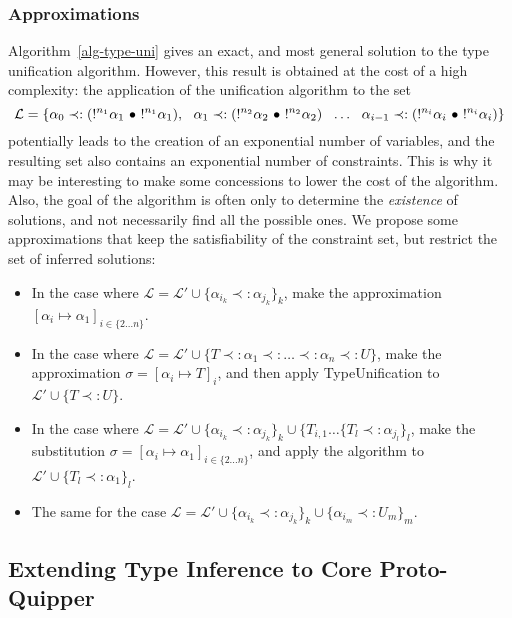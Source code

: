 \subsubsection{Approximations}

Algorithm~\ref{alg-type-uni} gives an exact, and most general solution to the type unification algorithm. However, this result is obtained at the cost of a high complexity:
the application of the unification algorithm to the set
{ \small
	$$\mathcal{L} = \{\alpha_0 \prec: (!^{n_1}\alpha_1 ~\bullet~ !^{n_1}\alpha_1), ~~ 
	\alpha_1 \prec: (!^{n_2}\alpha_2 ~\bullet~ !^{n_2}\alpha_2) ~~ \dots ~~ \alpha_{i-1} \prec: (!^{n_i}\alpha_i ~\bullet~ !^{n_i}\alpha_{i}) \}$$ }
potentially leads to the creation of an exponential number of variables, and the resulting set also contains an exponential number of
constraints.
This is why it may be interesting to make some concessions to lower the cost of the algorithm. Also, the goal of the algorithm is
often only to determine the {\em existence} of solutions, and not necessarily find all the possible ones.
We propose some approximations that keep the satisfiability of the constraint set, but restrict the set of inferred solutions:
	
\begin{itemize}
	\item In the case where $\mathcal{L} = \mathcal{L'} \cup \{\alpha_{i_k} \prec: \alpha_{j_k} \}_k$,
		make the approximation ${[\alpha_i \mapsto \alpha_1]_{i \in \{2 \dots n\}}}$.
		
	\item In the case where $\mathcal{L} = \mathcal{L'} \cup \{T \prec: \alpha_1 \prec: \dots \prec: \alpha_n \prec: U\}$, make the
		approximation $\sigma = [\alpha_i \mapsto T]_i$, and then apply TypeUnification to $\mathcal{L'} \cup \{ T \prec: U \}$.
		
	\item In the case where $\mathcal{L} = \mathcal{L'} \cup \{\alpha_{i_k} \prec: \alpha_{j_k}\}_k \cup
		\{T_{i, 1} \dots \{T_l \prec: \alpha_{j_l} \}_l$, make the substitution $\sigma = {[\alpha_i \mapsto \alpha_1]_{i \in \{2 \dots n\}}}$,
		and apply the algorithm to $\mathcal{L'} \cup \{T_l \prec: \alpha_1\}_l$.
		
	\item The same for the case $\mathcal{L} = \mathcal{L'} \cup \{\alpha_{i_k} \prec: \alpha_{j_k}\}_k \cup \{\alpha_{i_m} \prec: U_m\}_m$.
\end{itemize}

\subsection{Extending Type Inference to Core Proto-Quipper}
\label{ssec-extending-to-QP}

